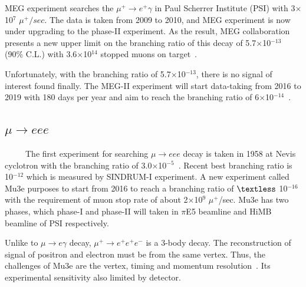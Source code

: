 MEG experiment searches the $\mu^+ \rightarrow e^{+}\gamma$ in Paul Scherrer Institute (PSI) with 3$\times$10$^7$ $\mu^+/sec$.
The data is taken from 2009 to 2010, and MEG experiment is now under upgrading to the phase-II experiment.
As the result, MEG collaboration presents a new upper limit on the branching ratio of this decay of 5.7$\times$10$^{-13}$ (90\% C.L.) with 3.6$\times$10$^{14}$ stopped muons on target~\cite{meg}.

Unfortunately, with the branching ratio of 5.7$\times$10$^{-13}$, there is no signal of interest found finally.
The MEG-II experiment will start data-taking from 2016 to 2019 with 180 days per year and aim to reach the branching ratio of 6$\times$10$^{-14}$~\cite{megtdr}.

\subsection{$\mu \rightarrow eee$}
~~~~~The first experiment for searching $\mu \rightarrow eee$ decay is taken in 1958 at Nevis cyclotron with the branching ratio of 3.0$\times$10$^{-5}$~\cite{lyn}.
Recent best branching ratio is 10$^{-12}$ which is measured by SINDRUM-I experiment.
A new experiment called Mu3e purposes to start from 2016 to reach a branching ratio of $\textless$ 10$^{-16}$ with the requirement of muon stop rate of about 2$\times$10$^9$ $\mu^+$/sec.
Mu3e has two phases, which phase-I and phase-II will taken in $\pi$E5 beamline and HiMB beamline of PSI respectively.

Unlike to $\mu \rightarrow e\gamma$ decay, $\mu^+ \rightarrow e^+e^+e^-$ is a 3-body decay.
The reconstruction of signal of positron and electron must be from the same vertex.
Thus, the challenges of Mu3e are the vertex, timing and momentum resolution~\cite{mu3e}.
Its experimental sensitivity also limited by detector.


